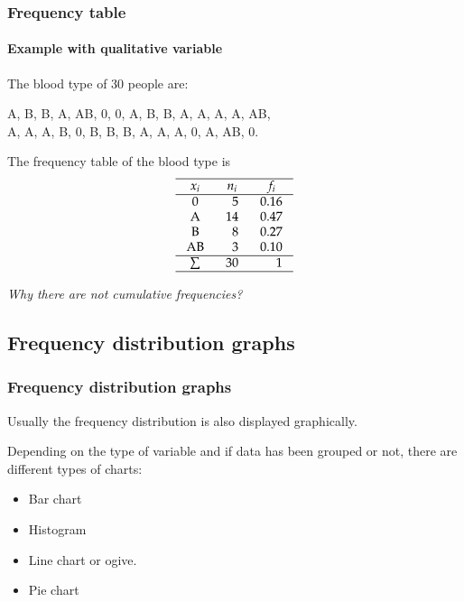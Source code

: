 \begin{frame}
\frametitle{Frequency table}
\framesubtitle{Example with qualitative variable}
The blood type of 30 people are:
\begin{center}
A, B, B, A, AB, 0, 0, A, B, B, A, A, A, A, AB,\\
A, A, A, B, 0, B, B, B, A, A, A, 0, A, AB, 0.
\end{center}
The frequency table of the blood type is 
\[
\setlength\arraycolsep{3mm}
\setlength\arrayrulewidth{0.5pt}
\begin{array}{crr}
\hline
\multicolumn{1}{c}{x_i} & \multicolumn{1}{c}{n_i} & \multicolumn{1}{c}{f_i} \\
\hline
\mbox{0} & 5 & 0.16 \\
\mbox{A} & 14 & 0.47 \\
\mbox{B} & 8 & 0.27 \\
\mbox{AB} & 3 & 0.10 \\
\hline
\sum & 30 & 1 \\
\hline
\end{array}
\]
\begin{center}
\emph{Why there are not cumulative frequencies?}
\end{center} 
\end{frame}


\subsection{Frequency distribution graphs}

\begin{frame}
\frametitle{Frequency distribution graphs}
Usually the frequency distribution is also displayed graphically.
 
Depending on the type of variable and if data has been grouped or not, there are different types of charts:
\begin{itemize}
\item Bar chart
\item Histogram
\item Line chart or ogive. 
\item Pie chart
\end{itemize}
\end{frame} 


